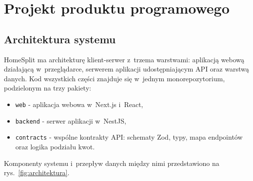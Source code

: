 \section{Projekt produktu programowego}

\subsection{Architektura systemu}

HomeSplit ma architekturę klient-serwer z~trzema warstwami: aplikacją webową działającą w~przeglądarce, serwerem aplikacji udostępniającym API oraz warstwą danych. Kod wszystkich części znajduje się w~jednym monorepozytorium, podzielonym na trzy pakiety:

\begin{itemize}
  \item \texttt{web} - aplikacja webowa w~Next.js i~React,
  \item \texttt{backend} - serwer aplikacji w~NestJS,
  \item \texttt{contracts} - wspólne kontrakty API: schematy Zod, typy, mapa endpointów oraz logika podziału kwot.
\end{itemize}

Komponenty systemu i~przepływ danych między nimi przedstawiono na rys.~\ref{fig:architektura}.

